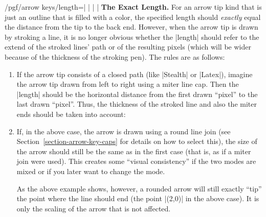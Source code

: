 \begin{key}{/pgf/arrow keys/length=| |%
        | |}
    \medskip
    \noindent \textbf{The Exact Length.}
    For an arrow tip kind that is just an outline that is filled with a color,
    the specified length should \emph{exactly} equal the distance from the tip
    to the back end. However, when the arrow tip is drawn by stroking a line,
    it is no longer obvious whether the |length| should refer to the extend of
    the stroked lines' path or of the resulting pixels (which will be wider
    because of the thickness of the stroking pen). The rules are as follows:
    \begin{enumerate}
        \item If the arrow tip consists of a closed path (like |Stealth| or
            |Latex|), imagine the arrow tip drawn from left to right using a
            miter line cap. Then the |length| should be the horizontal
            distance from the first drawn ``pixel'' to the last drawn
            ``pixel''. Thus, the thickness of the stroked line and also the
            miter ends should be taken into account:
\begin{codeexample}[preamble={\usetikzlibrary{arrows.meta}}]
\end{codeexample}
        \item If, in the above case, the arrow is drawn using a round line
            join (see Section~\ref{section-arrow-key-caps} for details on how
            to select this), the size of the arrow should still be the same
            as in the first case (that is, as if a miter join were used).
            This creates some ``visual consistency'' if the two modes are
            mixed or if you later want to change the mode.
\begin{codeexample}[preamble={\usetikzlibrary{arrows.meta}}]
\end{codeexample}
            As the above example shows, however, a rounded arrow will still
            exactly ``tip'' the point where the line should end (the point
            |(2,0)| in the above case). It is only the scaling of the arrow
            that is not affected.
  \end{enumerate}
\end{key}

